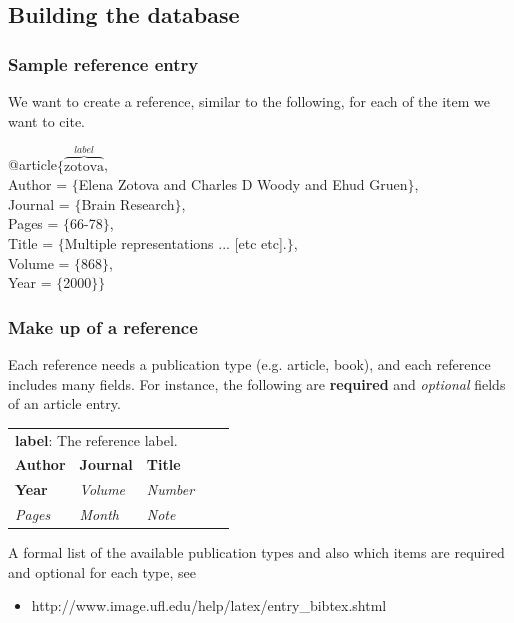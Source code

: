 \subsection[Building the database]{Building the database}

\begin{frame}  \frametitle{Sample reference entry}
We want to create a reference, similar to the following, for each of the item we want to cite.

\vspace{7mm}

@article$\{\overbrace{\text{zotova}}^{label}$, \\
\hspace{3mm}	Author = $\{$Elena Zotova and Charles D Woody and Ehud Gruen$\}$, \\
\hspace{3mm}	Journal = $\{$Brain Research$\}$, \\
\hspace{3mm}	Pages = $\{$66-78$\}$, \\
\hspace{3mm}	Title = $\{$Multiple representations ... [etc etc].$\}$, \\
\hspace{3mm}	Volume = $\{$868$\}$, \\
\hspace{3mm}	Year = $\{$2000$\}\}$ \\
\end{frame}

\begin{frame}  \frametitle{Make up of a reference}
Each reference needs a publication type (e.g. article, book), and each reference includes many fields. For instance, the following are \textbf{required} and \textit{optional} fields of an article entry.
\begin{center}
\begin{tabular}{lllrr}
\multicolumn{5}{l}{\textbf{label}: The reference label.} \\
\textbf{Author} & \textbf{Journal} & \textbf{Title} & \hspace{5mm} & \\
\textbf{Year} & \textit{Volume} & \textit{Number} \\
\textit{Pages} & \textit{Month} & \textit{Note}
\end{tabular}
\end{center}
A formal list of the available publication types and also which items are required and optional for each type, see
\begin{itemize}
\item[]\color{highlight}http://www.image.ufl.edu/help/latex/entry\_bibtex.shtml
\end{itemize}
\end{frame}

